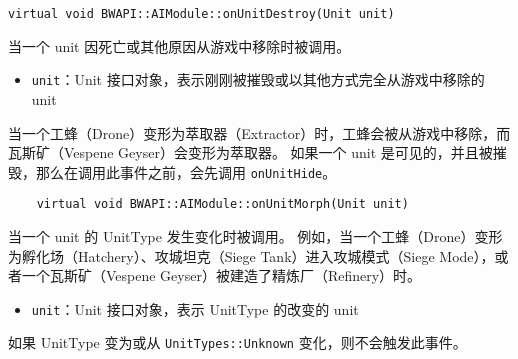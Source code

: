 \begin{tcolorbox}[colback=white, colframe=black!60!white, title=onUnitDestroy(), arc=0mm]
\begin{verbatim}
virtual void BWAPI::AIModule::onUnitDestroy(Unit unit)
\end{verbatim}
当一个 unit 因死亡或其他原因从游戏中移除时被调用。
\begin{parameter}
    \begin{itemize}
        \item \texttt{unit}：Unit 接口对象，表示刚刚被摧毁或以其他方式完全从游戏中移除的 unit
    \end{itemize}
\end{parameter}
\begin{note}
    当一个工蜂（Drone）变形为萃取器（Extractor）时，工蜂会被从游戏中移除，而瓦斯矿（Vespene Geyser）会变形为萃取器。  
    如果一个 unit 是可见的，并且被摧毁，那么在调用此事件之前，会先调用 \texttt{onUnitHide}。
\end{note}
\end{tcolorbox}

\begin{tcolorbox}[colback=white, colframe=black!60!white, title=onUnitMorph(), arc=0mm]
    \begin{verbatim}
    virtual void BWAPI::AIModule::onUnitMorph(Unit unit)
    \end{verbatim}
    当一个 unit 的 UnitType 发生变化时被调用。  
    例如，当一个工蜂（Drone）变形为孵化场（Hatchery）、攻城坦克（Siege Tank）进入攻城模式（Siege Mode），或者一个瓦斯矿（Vespene Geyser）被建造了精炼厂（Refinery）时。
    \begin{parameter}
        \begin{itemize}
            \item \texttt{unit}：Unit 接口对象，表示 UnitType 的改变的 unit
        \end{itemize}
    \end{parameter}
    \begin{note}
        如果 UnitType 变为或从 \texttt{UnitTypes::Unknown} 变化，则不会触发此事件。
    \end{note}
\end{tcolorbox}
    
